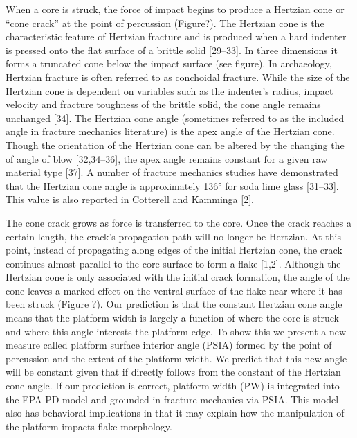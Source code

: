\documentclass[10pt,letterpaper]{article}
\begin{document}
When a core is struck, the force of impact begins to produce a Hertzian
cone or ``cone crack'' at the point of percussion (Figure?). The
Hertzian cone is the characteristic feature of Hertzian fracture and is
produced when a hard indenter is pressed onto the flat surface of a
brittle solid {[}29--33{]}. In three dimensions it forms a truncated
cone below the impact surface (see figure). In archaeology, Hertzian
fracture is often referred to as conchoidal fracture. While the size of
the Hertzian cone is dependent on variables such as the indenter's
radius, impact velocity and fracture toughness of the brittle solid, the
cone angle remains unchanged {[}34{]}. The Hertzian cone angle
(sometimes referred to as the included angle in fracture mechanics
literature) is the apex angle of the Hertzian cone. Though the
orientation of the Hertzian cone can be altered by the changing the of
angle of blow {[}32,34--36{]}, the apex angle remains constant for a
given raw material type {[}37{]}. A number of fracture mechanics studies
have demonstrated that the Hertzian cone angle is approximately 136° for
soda lime glass {[}31--33{]}. This value is also reported in Cotterell
and Kamminga {[}2{]}.

The cone crack grows as force is transferred to the core. Once the crack
reaches a certain length, the crack's propagation path will no longer be
Hertzian. At this point, instead of propagating along edges of the
initial Hertzian cone, the crack continues almost parallel to the core
surface to form a flake {[}1,2{]}. Although the Hertzian cone is only
associated with the initial crack formation, the angle of the cone
leaves a marked effect on the ventral surface of the flake near where it
has been struck (Figure ?). Our prediction is that the constant Hertzian
cone angle means that the platform width is largely a function of where
the core is struck and where this angle interests the platform edge. To
show this we present a new measure called platform surface interior
angle (PSIA) formed by the point of percussion and the extent of the
platform width. We predict that this new angle will be constant given
that if directly follows from the constant of the Hertzian cone angle.
If our prediction is correct, platform width (PW) is integrated into the
EPA-PD model and grounded in fracture mechanics via PSIA. This model
also has behavioral implications in that it may explain how the
manipulation of the platform impacts flake morphology.
\end{document}
